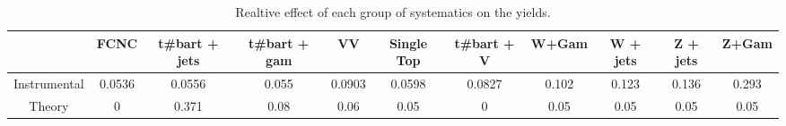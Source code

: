 \begin{table}[htbp]
\begin{center}
\begin{tabular}{|c|c|c|c|c|c|c|c|c|c|c|}
\hline 
      & FCNC      & t#bar{t} + jets      & t#bar{t} +  gam      & VV      & Single Top      & t#bar{t} + V      & W+Gam      & W + jets      & Z + jets      & Z+Gam \\ 
\hline 
 Instrumental & 0.0536 & 0.0556 & 0.055 & 0.0903 & 0.0598 & 0.0827 & 0.102 & 0.123 & 0.136 & 0.293 \\ 
 Theory & 0 & 0.371 & 0.08 & 0.06 & 0.05 & 0 & 0.05 & 0.05 & 0.05 & 0.05 \\ 
\hline 
\end{tabular} 
\caption{Realtive effect of each group of systematics on the yields.} 
\end{center} 
\end{table} 
